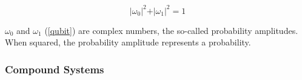 \begin{equation}
\label{2nd_axyom}
\vert\omega_{0}\vert^{2}+\vert\omega_{1}\vert^{2}=1
\end{equation}

 
$\omega_{0}$ and $\omega_{1}$ (\eqref{qubit}) are complex numbers, the so-called probability amplitudes. When squared, the probability amplitude represents a probability. 

\begin{comment}
We can define linear operators in the Hilbert space, one of the most important classes of operators being the self-adjoint operators,  $A = A^{*}$, that have the property stated in \eqref{eq_adjoint}. The Hermitian operator is one that satisfies the property of being equal to its conjugate transposed, $A = A^{*T} =A^\dagger$ .  In a finite-dimensional Hilbert space defined by a set of orthonormal basis every self-adjoint operator is Hermitian.

\begin{equation}
\label{eq_adjoint}
\langle A^{*}z\vert x\rangle=\langle z\vert Ax\rangle
\end{equation}

Observables are deemed as the physical properties that can be measured. One way to think of them is to consider the 20 question game, where a two player game where one person thinks of an object and then the second person has a set of 20 "Yes" or "No" to discover the object, one observable could be "Is it red?". With each question the space comprising the possible answers will not increase, this means that asking two times in a row if the object is red in the game will always yield the same answer.
 
Hermitian operators are suitable for being used as observables, as their eigenvalues are real numbers.
The eigenvectors associated with the eigenvalues of the observable will correspond to the state in which the system will be after applying the Hermitian operator. Thus applying an observable to the system can be viewed as doing a projection of the system in the basis formed by the eigenvectors.  
\end{comment}

\subsubsection{Compound Systems}

